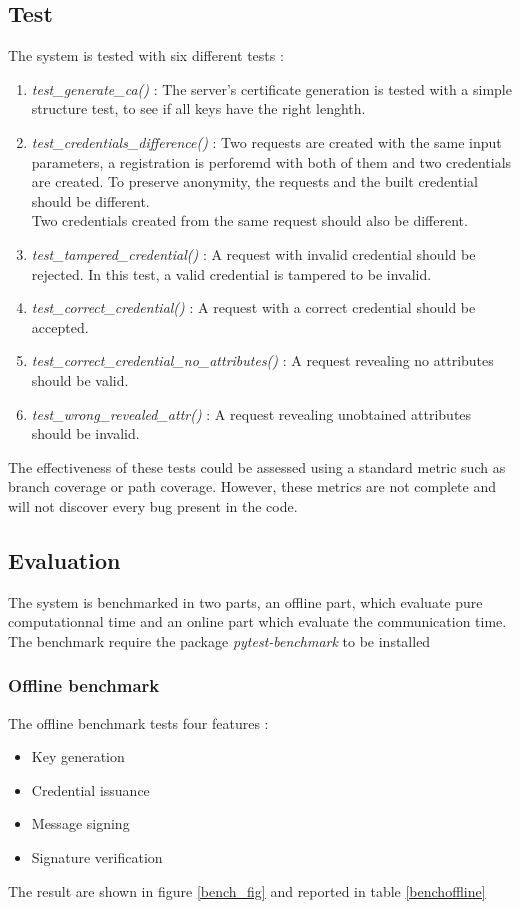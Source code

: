 \documentclass[10pt,conference,compsocconf]{IEEEtran}
\begin{document}
\subsection{Test}
The system is tested with six different tests : 
\begin{enumerate}
    \item \textit{test\_generate\_ca()} : The server's certificate generation is tested with a simple structure test, to see if all keys have the right lenghth.
    \item \textit{test\_credentials\_difference()} : Two requests are created with the same input parameters, a registration is perforemd with both of them and two credentials are created. To preserve anonymity, the requests and the built credential should be different. \\ Two credentials created from the same request should also be different.
    \item \textit{test\_tampered\_credential()} : A request with invalid credential should be rejected. In this test, a valid credential is tampered to be invalid.
    \item \textit{test\_correct\_credential()} : A request with a correct credential should be accepted.
    \item \textit{test\_correct\_credential\_no\_attributes()} : A request revealing no attributes should be valid.
    \item \textit{test\_wrong\_revealed\_attr()} : A request revealing unobtained attributes should be invalid.
\end{enumerate}
The effectiveness of these tests could be assessed using a standard metric such as branch coverage or path coverage. However, these metrics are not complete and will not discover every bug present in the code.


\subsection{Evaluation}
The system is benchmarked in two parts, an offline part, which evaluate pure computationnal time and an online part which evaluate the communication time. The benchmark require the package \textit{pytest-benchmark} to be installed

\subsubsection{Offline benchmark}
The offline benchmark tests four features :
\begin{itemize}
    \item Key generation
    \item Credential issuance
    \item Message signing
    \item Signature verification
\end{itemize}
The result are shown in figure \ref{bench_fig}
and reported in table \ref{benchoffline}
\end{document}
